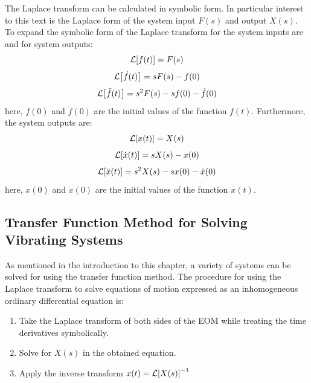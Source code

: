 \documentclass[12pt,letter]{article}
\begin{document}
\begin{review}
			The Laplace transform can be calculated in symbolic form. In particular interest to this text is the Laplace form of the system input $F(s)$ and output $X(s)$. To expand the symbolic form of the Laplace transform for the system inputs are 
			and for system outputs:
			\begin{equation}
				\label{eq:laplace_f}
				\mathcal{L}{\left[f(t)\right]} = F(s)
			\end{equation}		
			\begin{equation}
				\label{eq:laplace_f'}
				\mathcal{L}{\left[\dot{f}(t)\right]} = sF(s)-f(0)
			\end{equation}	
			\begin{equation}
				\label{eq:laplace_f''}
				\mathcal{L}{\left[\ddot{f}(t)\right]} = s^2F(s)-sf(0) - \dot{f}(0)
			\end{equation}	
			here, $f(0)$ and $\dot{f}(0)$ are the initial values of the function $f(t)$.  Furthermore, the system outputs are:
			\begin{equation}
				\label{eq:laplace_x}
				\mathcal{L}{\left[x(t)\right]} = X(s)
			\end{equation}		
			\begin{equation}
				\label{eq:laplace_x'}
				\mathcal{L}{\left[\dot{x}(t)\right]} = sX(s)-x(0)
			\end{equation}	
			\begin{equation}
				\label{eq:laplace_x''}
				\mathcal{L}{\left[\ddot{x}(t)\right]} = s^2X(s)-sx(0) - \dot{x}(0)
			\end{equation}	
			here, $x(0)$ and $\dot{x}(0)$ are the initial values of the function $x(t)$. 		
	
\end{review}

		\subsection{Transfer Function Method for Solving Vibrating Systems}
		
			As mentioned in the introduction to this chapter, a variety of systems can be solved for using the transfer function method. The procedure for using the Laplace transform to solve equations of motion expressed as an inhomogeneous ordinary differential equation is:
			\begin{enumerate}
				\item Take the Laplace transform of both sides of the EOM while treating the time derivatives symbolically.
				\item Solve for $X(s)$ in the obtained equation.
				\item Apply the inverse transform $x(t) = \mathcal{L}{\left[X(s)\right]}^{-1}$
			\end{enumerate}
				
\end{document}
